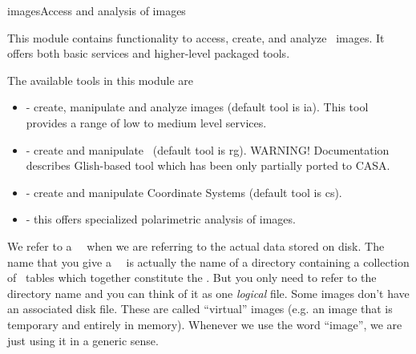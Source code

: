\begin{ahmodule}{images}{Access and analysis of images}


\bigskip
{} 

This module contains functionality to access, create, and analyze 
\casa\ images.  It offers both basic services and higher-level
packaged tools.

\noindent The available tools in this module are

\begin{itemize}

\item {} -  create, manipulate and analyze images
(default tool is {\stf ia}).  This tool provides a range of low to medium 
level services.  

\item {} - create and
manipulate \regions\ (default tool is {\stf rg}). {\stf WARNING!
Documentation describes Glish-based tool which has been only partially
ported to CASA.}

\item {} - create and manipulate Coordinate Systems
(default tool is {\stf cs}).


\item {} - this offers specialized polarimetric analysis of images.


\end{itemize}



We refer to a \casa\ \imagefile\ when we are referring to the actual
data stored on disk.  The name that you give a \casa\ \imagefile\ is
actually the name of a directory containing a collection of \casa\
tables which together constitute the \imagefile.  But you only need to
refer to the directory name and you can think of it as one {\it logical}
file.   Some images don't have an associated disk file.  These are
called ``virtual'' images (e.g. an image that is temporary and entirely
in memory). Whenever we use the word ``image'', we are just using it in
a generic sense.  


\end{ahmodule}
